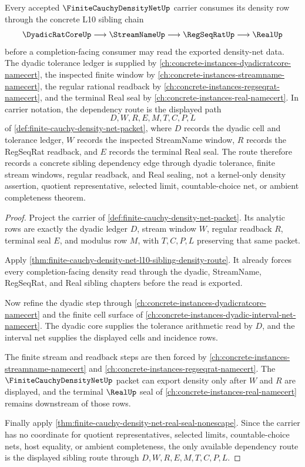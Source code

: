 \begin{theorem}
\label{thm:finite-cauchy-density-net-sibling-dependency}
Every accepted $\FiniteCauchyDensityNetUp$ carrier consumes its density row through the concrete L10 sibling chain
$$
\DyadicRatCoreUp \longrightarrow \StreamNameUp \longrightarrow \RegSeqRatUp \longrightarrow \RealUp
$$
before a completion-facing consumer may read the exported density-net data. The dyadic tolerance ledger is supplied by \autoref{ch:concrete-instances-dyadicratcore-namecert}, the inspected finite window by \autoref{ch:concrete-instances-streamname-namecert}, the regular rational readback by \autoref{ch:concrete-instances-regseqrat-namecert}, and the terminal Real seal by \autoref{ch:concrete-instances-real-namecert}. In carrier notation, the dependency route is the displayed path
$$
D,W,R,E,M,T,C,P,L
$$
of \autoref{def:finite-cauchy-density-net-packet}, where $D$ records the dyadic cell and tolerance ledger, $W$ records the inspected StreamName window, $R$ records the RegSeqRat readback, and $E$ records the terminal Real seal. The route therefore records a concrete sibling dependency edge through dyadic tolerance, finite stream windows, regular readback, and Real sealing, not a kernel-only density assertion, quotient representative, selected limit, countable-choice net, or ambient completeness theorem.
\end{theorem}
\begin{proof}
Project the carrier of \autoref{def:finite-cauchy-density-net-packet}. Its analytic rows are exactly the dyadic ledger $D$, stream window $W$, regular readback $R$, terminal seal $E$, and modulus row $M$, with $T,C,P,L$ preserving that same packet.

Apply \autoref{thm:finite-cauchy-density-net-l10-sibling-density-route}. It already forces every completion-facing density read through the dyadic, StreamName, RegSeqRat, and Real sibling chapters before the read is exported.

Now refine the dyadic step through \autoref{ch:concrete-instances-dyadicratcore-namecert} and the finite cell surface of \autoref{ch:concrete-instances-dyadic-interval-net-namecert}. The dyadic core supplies the tolerance arithmetic read by $D$, and the interval net supplies the displayed cells and incidence rows.

The finite stream and readback steps are then forced by \autoref{ch:concrete-instances-streamname-namecert} and \autoref{ch:concrete-instances-regseqrat-namecert}. The $\FiniteCauchyDensityNetUp$ packet can export density only after $W$ and $R$ are displayed, and the terminal $\RealUp$ seal of \autoref{ch:concrete-instances-real-namecert} remains downstream of those rows.

Finally apply \autoref{thm:finite-cauchy-density-net-real-seal-nonescape}. Since the carrier has no coordinate for quotient representatives, selected limits, countable-choice nets, host equality, or ambient completeness, the only available dependency route is the displayed sibling route through $D,W,R,E,M,T,C,P,L$.
\end{proof}
